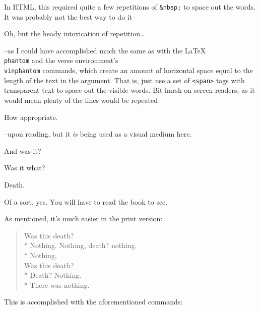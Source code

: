 \begin{paracol}{2}
\begin{leftcolumn}
In HTML, this required quite a few repetitions of \texttt{\&nbsp;} to space out the words. It was probably not the best way to do it--

\begin{ally}
  Oh, but the heady intoxication of repetition\ldots{}
\end{ally}
--as I could have accomplished much the same as with the \LaTeX\ \texttt{\\phantom} and the verse environment's \texttt{\\vinphantom} commands, which create an amount of horizontal space equal to the length of the text in the argument. That is, just use a set of \texttt{<span>} tags with transparent text to space out the visible words. Bit harsh on screen-readers, as it would mean plenty of the lines would be repeated--

\begin{ally}
  How appropriate.
\end{ally}
--upon reading, but it \emph{is} being used as a visual medium here.
\end{leftcolumn}
\begin{rightcolumn*}
\begin{ally}
  And was it?
\end{ally}
Was it what?

\begin{ally}
  Death.
\end{ally}
Of a sort, yes. You will have to read the book to see.
\end{rightcolumn*}
\begin{leftcolumn}

As mentioned, it's much easier in the print version:

\begin{verse}
 Was this death?\\*
Nothing. \phantom{Was this death?} Nothing, death? \phantom{Nothing,} nothing.\\*
 Nothing,\\
 Was this death?\\*
Death? \phantom{Was this death?} Nothing.\\*
\vspace{1em}
 There was nothing.\\
\end{verse}

\noindent This is accomplished with the aforementioned commands:


\end{leftcolumn}
\end{paracol}

